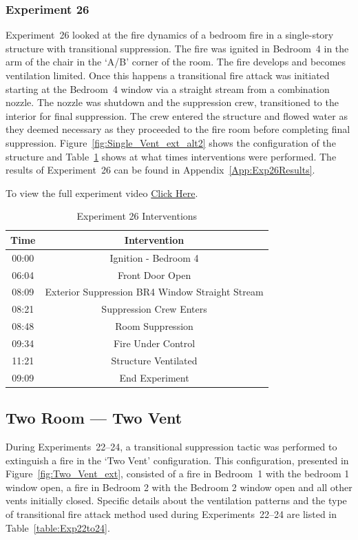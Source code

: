 \documentclass[12pt,oneside]{book}
\begin{document}
\FloatBarrier
\clearpage

\subsubsection{Experiment 26}
Experiment~26 looked at the fire dynamics of a bedroom fire in a single-story structure with transitional suppression. The fire was ignited in Bedroom~4 in the arm of the chair in the `A/B' corner of the room. The fire develops and becomes ventilation limited. Once this happens a transitional fire attack was initiated starting at the Bedroom~4 window via a straight stream from a combination nozzle. The nozzle was shutdown and the suppression crew, transitioned to the interior for final suppression. The crew entered the structure and flowed water as they deemed necessary as they proceeded to the fire room before completing final suppression.  Figure~\ref{fig:Single_Vent_ext_alt2} shows the configuration of the structure and Table~\ref{Table:Exp26Interventions} shows at what times interventions were performed. The results of Experiment~26 can be found in Appendix~\ref{App:Exp26Results}. 

To view the full experiment video \href{https://player.vimeo.com/video/170499626?autoplay=1}{Click Here}.

\begin{table}[H]
	\centering
	\caption{Experiment 26 Interventions}
	\begin{tabular}{|c|c|} 
		\hline
		Time & Intervention \\ \hline \hline
		00:00 & Ignition - Bedroom 4 \\ \hline
		06:04 & Front Door Open \\ \hline
		08:09 & Exterior Suppression BR4 Window Straight Stream \\ \hline
		08:21 & Suppression Crew Enters\\ \hline
		08:48 & Room Suppression \\ \hline 
		09:34 & Fire Under Control \\ \hline
		11:21 & Structure Ventilated \\ \hline
		09:09 & End Experiment\\ \hline
	\end{tabular}
	\label{Table:Exp26Interventions}
\end{table}

\clearpage

\subsection{Two Room --- Two Vent}
During Experiments~22--24, a transitional suppression tactic was performed to extinguish a fire in the `Two Vent' configuration. This configuration, presented in Figure~\ref{fig:Two_Vent_ext}, consisted of a fire in Bedroom~1 with the bedroom 1 window open, a fire in Bedroom 2 with the Bedroom 2 window open and all other vents initially closed. Specific details about the ventilation patterns and the type of transitional fire attack method used during Experiments~22--24 are listed in Table~\ref{table:Exp22to24}. 
\end{document}

